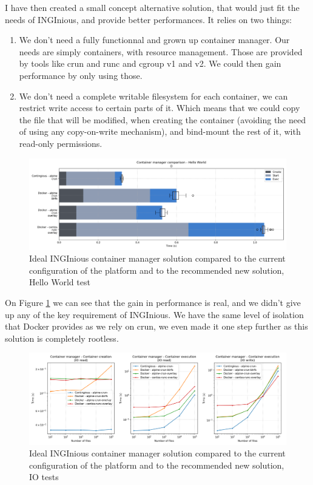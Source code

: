 I have then created a small concept alternative solution, that would just fit the needs of INGInious, and provide better performances.  It relies on two things:
\begin{enumerate}
  \item We don't need a fully functionnal and grown up container manager. Our needs are simply containers, with resource management.  Those are provided by tools like crun and runc and cgroup v1 and v2.  We could then gain performance by only using those.
  \item We don't need a complete writable filesystem for each container, we can restrict write access to certain parts of it.  Which means that we could copy the file that will be modified, when creating the container (avoiding the need of using any copy-on-write mechanism), and bind-mount the rest of it, with read-only permissions.
\end{enumerate}

\begin{figure}[h!]
  \begin{center}
    \includegraphics[width=\linewidth]{images/question-2-hello-world.png}
    \caption{Ideal INGInious container manager solution compared to the current configuration of the platform and to the recommended new solution, Hello World test}
    \label{fig:q2:hello-world}
  \end{center}
\end{figure}

On Figure \ref{fig:q2:hello-world} we can see that the gain in performance is real, and we didn't give up any of the key requirement of INGInious.  We have the same level of isolation that Docker provides as we rely on crun, we even made it one step further as this solution is completely rootless.

\begin{figure}[h!]
  \begin{center}
    \includegraphics[width=\linewidth]{images/question-2-io.png}
    \caption{Ideal INGInious container manager solution compared to the current configuration of the platform and to the recommended new solution, IO tests}
    \label{fig:q2:io}
  \end{center}
\end{figure}

